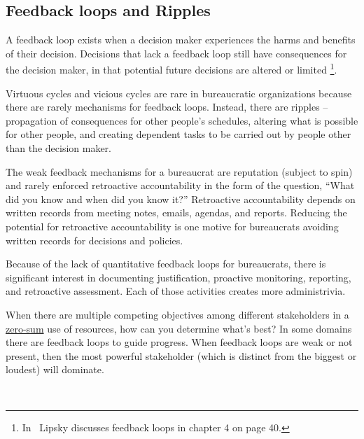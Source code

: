 \subsection*{Feedback loops and Ripples\label{sec:feedback-loop-and-ripples}}



A feedback loop exists when a decision maker experiences the harms and benefits of their decision. Decisions that lack a feedback loop still have consequences for the decision maker, in that potential future decisions are altered or limited \footnote{In~\cite{1983_Lipsky} Lipsky discusses feedback loops in chapter 4 on page 40.}.


Virtuous cycles and vicious cycles are rare in bureaucratic organizations because there are rarely mechanisms for feedback loops. Instead, there are \glspl{ripple} -- propagation of consequences for other people's schedules, altering what is possible for other people, and creating dependent tasks to be carried out by people other than the decision maker.


The weak feedback mechanisms for a bureaucrat are reputation (subject to spin)
and rarely enforced retroactive accountability in the form of the question, ``What did you know and when did you know it?''
Retroactive accountability depends on written records from meeting notes, emails, agendas, and reports. Reducing the potential for retroactive accountability is one motive for bureaucrats avoiding written records for decisions and policies.


Because of the lack of quantitative feedback loops for bureaucrats, there is significant interest in documenting justification, proactive monitoring, reporting, and retroactive assessment. Each of those activities creates more administrivia.


When there are multiple competing objectives among different stakeholders in a 
\href{https://en.wikipedia.org/wiki/Zero-sum_game}{zero-sum}
use of resources, how can you determine what's best? In some domains there are feedback loops to guide progress. When feedback loops are weak or not present, then the most powerful stakeholder (which is distinct from the biggest or loudest) will dominate. 


\ \\

